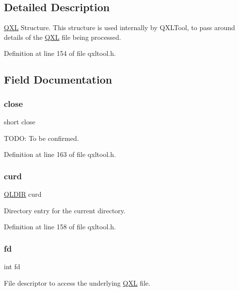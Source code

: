 \subsection{Detailed Description}
\hyperlink{struct_q_x_l}{Q\+XL} Structure. This structure is used internally by Q\+X\+L\+Tool, to pass around details of the \hyperlink{struct_q_x_l}{Q\+XL} file being processed. 

Definition at line 154 of file qxltool.\+h.



\subsection{Field Documentation}
\mbox{\label{struct_q_x_l_ab6947e12da3463e7a671017f8804ebc8}} 
\subsubsection{\texorpdfstring{close}{close}}
{\footnotesize\ttfamily short close}

T\+O\+DO\+: To be confirmed. 

Definition at line 163 of file qxltool.\+h.

\mbox{\label{struct_q_x_l_a6de489f08d735198d49d93db47ac17d3}} 
\subsubsection{\texorpdfstring{curd}{curd}}
{\footnotesize\ttfamily \hyperlink{struct_q_l_d_i_r}{Q\+L\+D\+IR} curd}

Directory entry for the current directory. 

Definition at line 158 of file qxltool.\+h.

\mbox{\label{struct_q_x_l_a6f8059414f0228f0256115e024eeed4b}} 
\subsubsection{\texorpdfstring{fd}{fd}}
{\footnotesize\ttfamily int fd}

File descriptor to access the underlying \hyperlink{struct_q_x_l}{Q\+XL} file. 

